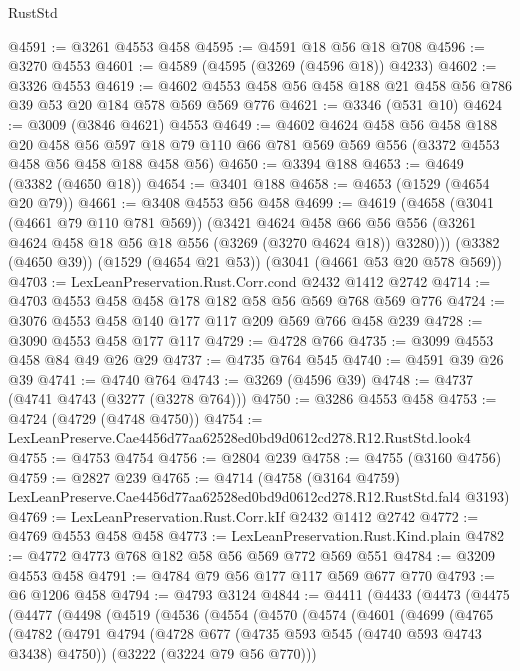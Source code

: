 \begin{lexlean}{RustStd}
\begin{coremodule}
@4591 := @3261 @4553 @458
@4595 := @4591 @18 @56 @18 @708
@4596 := @3270 @4553
@4601 := @4589 (@4595 (@3269 (@4596 @18)) @4233)
@4602 := @3326 @4553
@4619 := @4602 @4553 @458 @56 @458 @188 @21 @458 @56 @786 @39 @53 @20 @184 @578 @569 @569 @776
@4621 := @3346 (@531 @10)
@4624 := @3009 (@3846 @4621) @4553
@4649 := @4602
    @4624
    @458
    @56
    @458
    @188
    @20
    @458
    @56
    @597
    @18
    @79
    @110
    @66
    @781
    @569
    @569
    @556
    (@3372 @4553 @458 @56 @458 @188 @458 @56)
@4650 := @3394 @188
@4653 := @4649 (@3382 (@4650 @18))
@4654 := @3401 @188
@4658 := @4653 (@1529 (@4654 @20 @79))
@4661 := @3408 @4553 @56 @458
@4699 := @4619
    (@4658
      (@3041 (@4661 @79 @110 @781 @569))
      (@3421
        @4624
        @458
        @66
        @56
        @556
        (@3261 @4624 @458 @18 @56 @18 @556 (@3269 (@3270 @4624 @18)) @3280)))
    (@3382 (@4650 @39))
    (@1529 (@4654 @21 @53))
    (@3041 (@4661 @53 @20 @578 @569))
@4703 := LexLeanPreservation.Rust.Corr.cond @2432 @1412 @2742
@4714 := @4703 @4553 @458 @458 @178 @182 @58 @56 @569 @768 @569 @776
@4724 := @3076 @4553 @458 @140 @177 @117 @209 @569 @766 @458 @239
@4728 := @3090 @4553 @458 @177 @117
@4729 := @4728 @766
@4735 := @3099 @4553 @458 @84 @49 @26 @29
@4737 := @4735 @764 @545
@4740 := @4591 @39 @26 @39
@4741 := @4740 @764
@4743 := @3269 (@4596 @39)
@4748 := @4737 (@4741 @4743 (@3277 (@3278 @764)))
@4750 := @3286 @4553 @458
@4753 := @4724 (@4729 (@4748 @4750))
@4754 := LexLeanPreserve.Cae4456d77aa62528ed0bd9d0612cd278.R12.RustStd.look4
@4755 := @4753 @4754
@4756 := @2804 @239
@4758 := @4755 (@3160 @4756)
@4759 := @2827 @239
@4765 := @4714
    (@4758 (@3164 @4759) LexLeanPreserve.Cae4456d77aa62528ed0bd9d0612cd278.R12.RustStd.fal4 @3193)
@4769 := LexLeanPreservation.Rust.Corr.kIf @2432 @1412 @2742
@4772 := @4769 @4553 @458 @458
@4773 := LexLeanPreservation.Rust.Kind.plain
@4782 := @4772 @4773 @768 @182 @58 @56 @569 @772 @569 @551
@4784 := @3209 @4553 @458
@4791 := @4784 @79 @56 @177 @117 @569 @677 @770
@4793 := @6 @1206 @458
@4794 := @4793 @3124
@4844 := @4411
    (@4433
      (@4473
        (@4475
          (@4477
            (@4498
              (@4519
                (@4536
                  (@4554
                    (@4570
                      (@4574
                        (@4601
                          (@4699
                            (@4765
                              (@4782
                                (@4791
                                  @4794
                                  (@4728 @677 (@4735 @593 @545 (@4740 @593 @4743 @3438) @4750))
                                  (@3222 (@3224 @79 @56 @770)))

\end{coremodule}
\end{lexlean}

